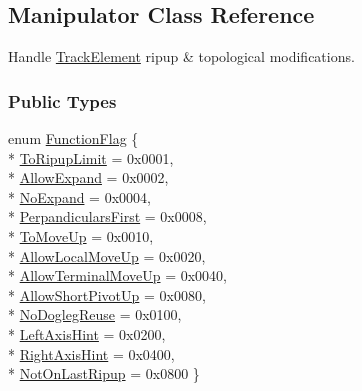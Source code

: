 \hypertarget{classKite_1_1Manipulator}{\subsection{Manipulator Class Reference}
\label{classKite_1_1Manipulator}
}


Handle \hyperlink{classKite_1_1TrackElement}{Track\-Element} ripup \& topological modifications.  


\subsubsection*{Public Types}
\begin{DoxyCompactItemize}
\item 
enum \hyperlink{classKite_1_1Manipulator_a2af2ad6b6441614038caf59d04b3b217}{Function\-Flag} \{ \\*
\hyperlink{classKite_1_1Manipulator_a2af2ad6b6441614038caf59d04b3b217a6c00c46010d69247a3edc18b70d700fa}{To\-Ripup\-Limit} = 0x0001, 
\\*
\hyperlink{classKite_1_1Manipulator_a2af2ad6b6441614038caf59d04b3b217a41880b9f6652400677e21c8681f97675}{Allow\-Expand} = 0x0002, 
\\*
\hyperlink{classKite_1_1Manipulator_a2af2ad6b6441614038caf59d04b3b217a6d972ea7eb37fa1b58a9b3b805241ffd}{No\-Expand} = 0x0004, 
\\*
\hyperlink{classKite_1_1Manipulator_a2af2ad6b6441614038caf59d04b3b217acdaeb48fa352f2898aa225b618ca26d4}{Perpandiculars\-First} = 0x0008, 
\\*
\hyperlink{classKite_1_1Manipulator_a2af2ad6b6441614038caf59d04b3b217a6d49b8eaa1014c8d0169a22b2f675b4d}{To\-Move\-Up} = 0x0010, 
\\*
\hyperlink{classKite_1_1Manipulator_a2af2ad6b6441614038caf59d04b3b217a195c742e60b541424ed7b231e9736803}{Allow\-Local\-Move\-Up} = 0x0020, 
\\*
\hyperlink{classKite_1_1Manipulator_a2af2ad6b6441614038caf59d04b3b217ad16eaf385267fc57b0deba7cf2c49244}{Allow\-Terminal\-Move\-Up} = 0x0040, 
\\*
\hyperlink{classKite_1_1Manipulator_a2af2ad6b6441614038caf59d04b3b217a03c3d2cc0e6cfcf5cb2022d70a07f510}{Allow\-Short\-Pivot\-Up} = 0x0080, 
\\*
\hyperlink{classKite_1_1Manipulator_a2af2ad6b6441614038caf59d04b3b217ab254c6d61bbff307a2eb6592e1546131}{No\-Dogleg\-Reuse} = 0x0100, 
\\*
\hyperlink{classKite_1_1Manipulator_a2af2ad6b6441614038caf59d04b3b217ab525fc8ee72323922f991c26e098bd5a}{Left\-Axis\-Hint} = 0x0200, 
\\*
\hyperlink{classKite_1_1Manipulator_a2af2ad6b6441614038caf59d04b3b217a4412082ce8109b740834fe21e7a671fb}{Right\-Axis\-Hint} = 0x0400, 
\\*
\hyperlink{classKite_1_1Manipulator_a2af2ad6b6441614038caf59d04b3b217aeea607aabb515b52c3b29df30b079d21}{Not\-On\-Last\-Ripup} = 0x0800
 \}
\end{DoxyCompactItemize}

